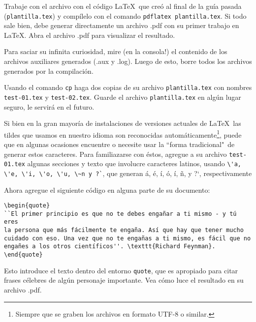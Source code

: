 \documentclass[11pt]{exam}
\begin{document}
\begin{questions}
\item Trabaje con el archivo con el código \LaTeX\ que creó al final de la guía pasada (\texttt{plantilla.tex}) y compílelo con el comando \texttt{pdflatex plantilla.tex}. Si todo sale bien, debe generar directamente un archivo .pdf con su primer trabajo en \LaTeX.
Abra el archivo .pdf para visualizar el resultado.

\item Para saciar su infinita curiosidad, mire (en la consola!) el contenido de los archivos auxiliares generados (.aux y .log). Luego de esto, borre todos los archivos generados por la compilación.

\item Usando el comando \texttt{cp} haga dos copias de su archivo \texttt{plantilla.tex} con nombres \texttt{test-01.tex} y \texttt{test-02.tex}. Guarde el archivo \texttt{plantilla.tex} en algún lugar seguro, le servirá en el futuro.

\item Si bien en la gran mayoría de instalaciones de versiones actuales de \LaTeX\, las tildes que usamos en nuestro idioma son reconocidas automáticamente\footnote{Siempre que se graben los archivos en formato UTF-8 o similar.}, puede que en algunas ocasiones encuentre o necesite usar la ``forma tradicional"\, de generar estos caracteres. Para familiazarse con éstos, agregue a su archivo \texttt{test-01.tex} algunas secciones y texto que involucre caracteres latinos, usando \verb|\'a, \'e, \'i, \'o, \'u, \~n y ?`|, que generan á, é, í, ó, í, \~n, y ?`, respectivamente

\item Ahora agregue el siguiente código en alguna parte de su documento:

\begin{verbatim}
\begin{quote}
``El primer principio es que no te debes engañar a ti mismo - y tú eres 
la persona que más fácilmente te engaña. Así que hay que tener mucho 
cuidado con eso. Una vez que no te engañas a ti mismo, es fácil que no 
engañes a los otros científicos''. \texttt{Richard Feynman}.
\end{quote}
\end{verbatim}

Esto introduce el texto dentro del entorno \texttt{quote}, que es apropiado para citar frases célebres de algún personaje importante. Vea cómo luce el resultado en su archivo .pdf.


\end{questions}
\end{document}

